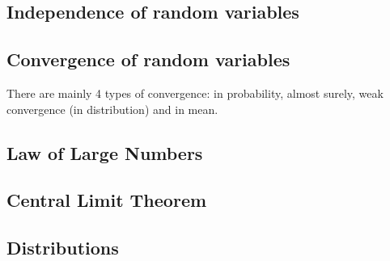 \subsection{Independence of random variables}
\subsection{Convergence of random variables} 
There are mainly 4 types of convergence: in probability, almost surely, weak convergence (in distribution) and in mean. 
\subsection{Law of Large Numbers}
\subsection{Central Limit Theorem}
\subsection{Distributions}